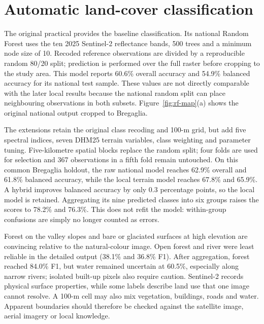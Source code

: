 
\chapter{Automatic land-cover classification}
\label{chap:classification}

The original practical provides the baseline classification. Its national
Random Forest uses the ten 2025 Sentinel-2 reflectance bands, 500 trees and a
minimum node size of 10. Recoded reference observations are divided by a
reproducible random 80/20 split; prediction is performed over the full raster
before cropping to the study area. This model reports 60.6\% overall accuracy
and 54.9\% balanced accuracy for its national test sample. These values are not
directly comparable with the later local results because the national random
split can place neighbouring observations in both subsets. Figure~\ref{fig:rf-map}(a)
shows the original national output cropped to Bregaglia.

The extensions retain the original class recoding and 100-m grid, but add five
spectral indices, seven DHM25 terrain variables, class weighting and parameter
tuning. Five-kilometre spatial blocks replace the random split; four folds are
used for selection and 367 observations in a fifth fold remain untouched. On
this common Bregaglia holdout, the raw national model reaches 62.9\% overall
and 61.8\% balanced accuracy, while the local terrain model reaches 67.8\% and
65.9\%. A hybrid improves balanced accuracy by only 0.3 percentage points, so
the local model is retained. Aggregating its nine predicted classes into six
groups raises the scores to 78.2\% and 76.3\%. This does not refit the model:
within-group confusions are simply no longer counted as errors.

Forest on the valley slopes and bare or glaciated surfaces at high elevation
are convincing relative to the natural-colour image. Open forest and river
were least reliable in the detailed output (38.1\% and 36.8\% F1). After
aggregation, forest reached 84.0\% F1, but water remained uncertain at 60.5\%,
especially along narrow rivers; isolated built-up pixels also require caution.
Sentinel-2 records physical surface properties, while some labels describe land
use that one image cannot resolve. A 100-m cell may also mix vegetation,
buildings, roads and water. Apparent boundaries should therefore be checked
against the satellite image, aerial imagery or local knowledge.

